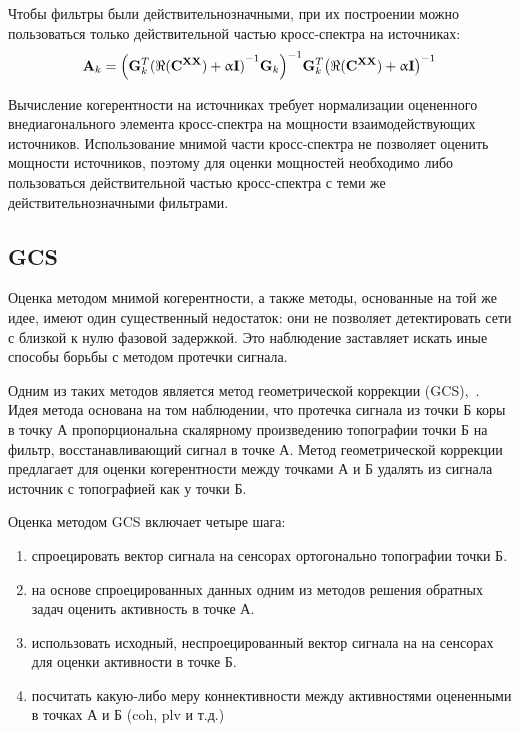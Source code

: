 Чтобы фильтры были действительнозначными, при их построении
можно пользоваться только действительной частью кросс-спектра на источниках:
\begin{equation}
    \mathbf{A}_k =
    {\left(\mathbf{G}_k^T {(\Re(\mathbf{C}^{\mathbf{X X}}) + \upalpha \mathbf{I})}^{-1} \mathbf{G}_k\right)}^{-1}
    \mathbf{G}_k^T {\left(\Re(\mathbf{C}^{\mathbf{X X}}) + \upalpha \mathbf{I}\right)}^{-1}
    \label{eq:idics_filters}
\end{equation}

Вычисление когерентности на источниках требует нормализации оцененного
внедиагонального элемента кросс-спектра на мощности взаимодействующих
источников. Использование мнимой части кросс-спектра не позволяет
оценить мощности источников, поэтому для оценки мощностей необходимо либо
пользоваться действительной частью кросс-спектра с теми же действительнозначными
фильтрами.


\subsection{GCS}
Оценка методом мнимой когерентности, а также методы, основанные на 
той же идее, имеют один существенный недостаток: они не позволяет
детектировать сети с близкой к нулю фазовой задержкой. Это наблюдение
заставляет искать иные способы борьбы с методом протечки сигнала.

Одним из таких методов является метод геометрической коррекции
(GCS),~\cite{GCS}.  Идея метода основана на том наблюдении, что протечка
сигнала из точки Б коры в точку А пропорциональна скалярному произведению
топографии точки Б на фильтр, восстанавливающий сигнал в точке А. Метод
геометрической коррекции предлагает для оценки когерентности между точками А и
Б удалять из сигнала источник с топографией как у точки Б.

Оценка методом GCS включает четыре шага:

\begin{enumerate}
    \item спроецировать вектор сигнала на сенсорах ортогонально
        топографии точки Б.
    \item на основе спроецированных данных одним из методов решения
        обратных задач оценить активность в точке А.
    \item использовать исходный, неспроецированный вектор сигнала на на сенсорах
        для оценки активности в точке Б.
    \item посчитать какую-либо меру коннективности между активностями
        оцененными в точках А и Б (coh, plv и т.д.)
\end{enumerate}

